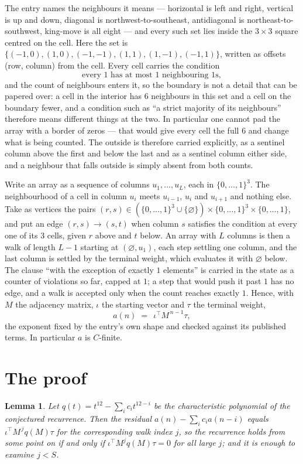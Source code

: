 \documentclass[11pt,a4paper]{article}
\theoremstyle{plain}
\newtheorem{lemma}[theorem]{Lemma}
\theoremstyle{definition}
\begin{document}
The entry names the neighbours it means --- horizontal is left and right, vertical is up and
down, diagonal is northwest-to-southeast, antidiagonal is northeast-to-southwest, king-move is
all eight --- and every such set lies inside the $3\times3$ square centred on the cell. Here
the set is $\{(-1,0), (1,0), (-1,-1), (1,1), (1,-1), (-1,1)\}$, written as offsets (row, column) from the cell. Every cell carries
the condition
\[
\text{every 1 has at most 1 neighbouring 1s},
\]
and the count of neighbours enters it, so the boundary is not a detail that can be papered
over: a cell in the interior has $6$ neighbours in this set and a cell on the boundary
fewer, and a condition such as ``a strict majority of its neighbours'' therefore means
different things at the two. In particular one cannot pad the array with a border of zeros ---
that would give every cell the full $6$ and change what is being counted. The outside is
therefore carried
explicitly, as a sentinel column above the first and below the last and as a sentinel column
either side, and a neighbour that falls outside is simply absent from both counts.

Write an array as a sequence of columns $u_1,\dots,u_L$, each in
$\{0,\dots,1\}^{3}$. The neighbourhood of a cell in column $u_i$ meets $u_{i-1}$,
$u_i$ and $u_{i+1}$ and nothing else. Take as vertices the pairs
$(r,s)\in(\{0,\dots,1\}^{3}\cup\{\varnothing\})\times\{0,\dots,1\}^{3} \times \{0,\dots,1\}$,
and put an edge $(r,s)\to(s,t)$ when column $s$ satisfies the condition at every one of its
$3$ cells, given $r$ above and $t$ below. An array with $L$ columns is then a walk of length
$L-1$ starting at $(\varnothing,u_1)$, each step settling one column, and the last column is
settled by the terminal weight, which evaluates it with $\varnothing$ below. The clause ``with the exception of exactly $1$ elements'' is carried in
the state as a counter of violations so far, capped at $1$; a step that would push it past
$1$ has no edge, and a walk is accepted only when the count reaches exactly $1$. Hence,
with $M$ the adjacency matrix, $\iota$ the starting vector and $\tau$ the terminal weight,
\[
a(n)\;=\;\,\iota^{\!\top}M^{\,n-1}\tau ,
\]
the exponent fixed by the entry's own shape and checked against its published terms. In
particular $a$ is $C$-finite.

\section{The proof}

\begin{lemma}\label{lem:crit}
Let $q(t)=t^{12}-\sum_i c_it^{12-i}$ be the characteristic polynomial of the
conjectured recurrence. Then the residual $a(n)-\sum_ic_ia(n-i)$ equals
$\iota^{\!\top}M^{\,j}q(M)\tau$ for the corresponding walk index $j$, so the
recurrence holds from some point on if and only if $\iota^{\!\top}M^{j}q(M)\tau=0$ for all
large $j$; and it is enough to examine $j<S$.
\end{lemma}
\end{document}
